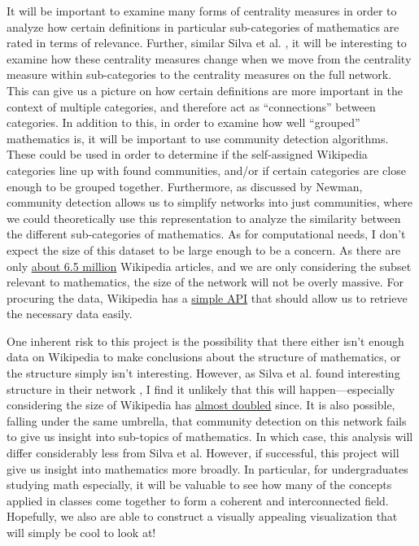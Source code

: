 \documentclass[10pt]{paper}
\begin{document}
It will be important to examine many forms of centrality measures in order to analyze how certain definitions in particular sub-categories of mathematics are rated in terms of relevance. Further, similar Silva et al. \cite{silva2011investigating}, it will be interesting to examine how these centrality measures change when we move from the centrality measure within sub-categories to the centrality measures on the full network. 
This can give us a picture on how certain definitions are more important in the context of multiple categories, and therefore act as ``connections'' between categories. In addition to this, in order to examine how well ``grouped'' mathematics is, it will be important to use community detection algorithms. These could be used in order to determine if the self-assigned Wikipedia categories line up with found communities, and/or if certain categories are close enough to be grouped together. 
Furthermore, as discussed by Newman, community detection allows us to simplify networks into just communities, where we could theoretically use this representation to analyze the similarity between the different sub-categories of mathematics. 
As for computational needs, I don't expect the size of this dataset to be large enough to be a concern. As there are only \href{https://en.wikipedia.org/wiki/Wikipedia:Size_of_Wikipedia}{about 6.5 million} Wikipedia articles, and we are only considering the subset relevant to mathematics, the size of the network will not be overly massive. 
For procuring the data, Wikipedia has a \href{https://www.mediawiki.org/wiki/API:Main_page}{simple API} that should allow us to retrieve the necessary data easily. 

One inherent risk to this project is the possibility that there either isn't enough data on Wikipedia to make conclusions about the structure of mathematics, or the structure simply isn't interesting. However, as Silva et al. found interesting structure in their network \cite{silva2011investigating}, I find it unlikely that this will happen---especially considering the size of Wikipedia has \href{https://en.wikipedia.org/wiki/Wikipedia:Size_of_Wikipedia}{almost doubled} since. 
It is also possible, falling under the same umbrella, that community detection on this network fails to give us insight into sub-topics of mathematics. In which case, this analysis will differ considerably less from Silva et al. However, if successful, this project will give us insight into mathematics more broadly. In particular, for undergraduates studying math especially, it will be valuable to see how many of the concepts applied in classes come together to form a coherent and interconnected field. 
Hopefully, we also are able to construct a visually appealing visualization that will simply be cool to look at! 



\newpage 
\printbibliography
\end{document}
